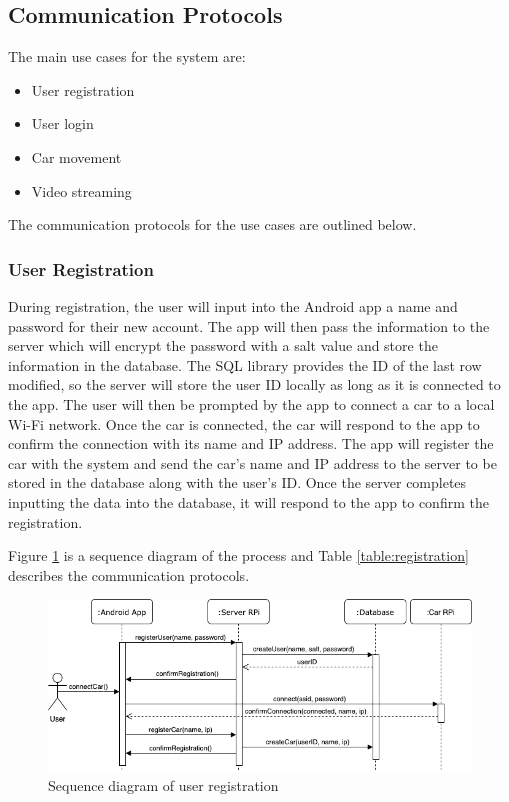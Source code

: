 \documentclass[letterpaper,12pt]{report}
\begin{document}
    \subsection{Communication Protocols}

    The main use cases for the system are:
    \begin{itemize}
            \item User registration
            \item User login
            \item Car movement
            \item Video streaming
    \end{itemize}

    The communication protocols for the use cases are outlined below.

    \subsubsection{User Registration}

    During registration, the user will input into the Android app a name and
    password for their new account. The app will then pass the information
    to the server which will encrypt the password with a salt value and
    store the information in the database. The SQL library provides the ID
    of the last row modified, so the server will store the user ID locally
    as long as it is connected to the app. The user will then be prompted by
    the app to connect a car to a local Wi-Fi network. Once the car is
    connected, the car will respond to the app to confirm the connection
    with its name and IP address. The app will register the car with the
    system and send the car’s name and IP address to the server to be stored
    in the database along with the user’s ID. Once the server completes
    inputting the data into the database, it will respond to the app to
    confirm the registration.

    Figure \ref{fig:registration} is a sequence diagram of the process and Table
    \ref{table:registration} describes the communication protocols.

    \begin{figure}[H]
        \centering
        \includegraphics[width=0.9\linewidth]{diagrams/Design_Registration_Sequence.png}
        \caption{Sequence diagram of user registration}
        \label{fig:registration}
    \end{figure}
\end{document}
